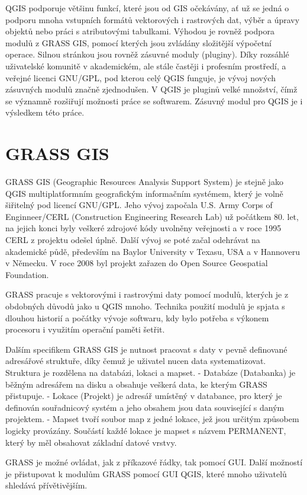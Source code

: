 QGIS podporuje většinu funkcí, které jsou od GIS očekávány, ať už se jedná o podporu mnoha vstupních formátů vektorových i rastrových dat, výběr a úpravy objektů nebo práci s atributovými tabulkami. Výhodou je rovněž podpora modulů z GRASS GIS, pomocí kterých jsou zvládány složitější výpočetní operace.
Silnou stránkou jsou rovněž zásuvné moduly (pluginy). Díky rozsáhlé uživatelské komunitě v akademickém, ale stále častěji i profesním prostředí, a veřejné licenci GNU/GPL, pod kterou celý QGIS funguje, je vývoj nových zásuvných modulů značně zjednodušen. V QGIS je pluginů velké množství, čímž se významně rozšiřují možnosti práce se softwarem. Zásuvný modul pro QGIS je i výsledkem této práce.

\section{GRASS GIS}
GRASS GIS (Geographic Resources Analysis Support System) je stejně jako QGIS multiplatformním geografickým informačním systémem, který je volně šiřitelný pod licencí GNU/GPL. Jeho vývoj započala U.S. Army Corps of Enginneer/CERL (Construction Engineering Research Lab) už počátkem 80. let, na jejich konci byly veškeré zdrojové kódy uvolněny veřejnosti a v roce 1995 CERL z projektu odešel úplně. Další vývoj se poté začal odehrávat na akademické půdě, především na Baylor University v Texasu, USA a v Hannoveru v Německu. V roce 2008 byl projekt zařazen do Open Source Geospatial Foundation.

GRASS pracuje s vektorovými i rastrovými daty pomocí modulů, kterých je z obdobných důvodů jako u QGIS mnoho. Technika použití modulů je spjata s dlouhou historií a počátky vývoje softwaru, kdy bylo potřeba s výkonem procesoru i využitím operační paměti šetřit. 

Dalším specifikem GRASS GIS je nutnost pracovat s daty v pevně definované adresářové struktuře, díky čemuž je uživatel nucen data systematizovat. Struktura je rozdělena na databázi, lokaci a mapset. 
-	Databáze (Databanka) je běžným adresářem na disku a obsahuje veškerá data, ke kterým GRASS přistupuje. 
-	Lokace (Projekt) je adresář umístěný v databance, pro který je definován souřadnicový systém a jeho obsahem jsou data související s daným projektem.
-	Mapset tvoří soubor map z jedné lokace, jež jsou určitým způsobem logicky provázány. Součástí každé lokace je mapset s názvem PERMANENT, který by měl obsahovat základní datové vrstvy.

GRASS je možné ovládat, jak z příkazové řádky, tak pomocí GUI. Další možností je přistupovat k modulům GRASS pomocí GUI QGIS, které mnoho uživatelů shledává přívětivějším.
